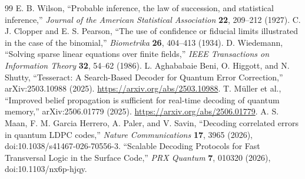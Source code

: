 \begin{thebibliography}{99}
 E. B. Wilson, ``Probable inference, the law of succession, and statistical inference,'' \emph{Journal of the American Statistical Association} \textbf{22}, 209--212 (1927).
 C. J. Clopper and E. S. Pearson, ``The use of confidence or fiducial limits illustrated in the case of the binomial,'' \emph{Biometrika} \textbf{26}, 404--413 (1934).
 D. Wiedemann, ``Solving sparse linear equations over finite fields,'' \emph{IEEE Transactions on Information Theory} \textbf{32}, 54--62 (1986).
 L. Aghababaie Beni, O. Higgott, and N. Shutty, ``Tesseract: A Search-Based Decoder for Quantum Error Correction,'' arXiv:2503.10988 (2025). \url{https://arxiv.org/abs/2503.10988}.
 T. M\"uller et al., ``Improved belief propagation is sufficient for real-time decoding of quantum memory,'' arXiv:2506.01779 (2025). \url{https://arxiv.org/abs/2506.01779}.
 A. S. Maan, F. M. Garcia Herrero, A. Paler, and V. Savin, ``Decoding correlated errors in quantum LDPC codes,'' \emph{Nature Communications} \textbf{17}, 3965 (2026), doi:10.1038/s41467-026-70556-3.
 ``Scalable Decoding Protocols for Fast Transversal Logic in the Surface Code,'' \emph{PRX Quantum} \textbf{7}, 010320 (2026), doi:10.1103/nx6p-hjqy.
\end{thebibliography}
